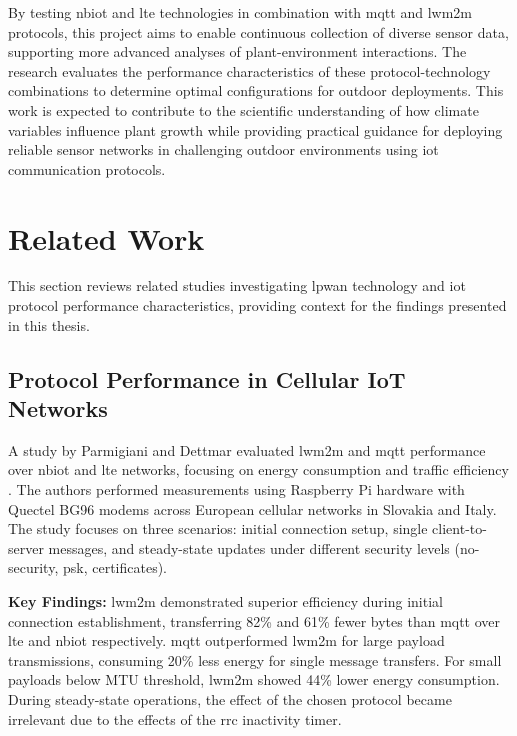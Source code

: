 \documentclass[12pt, english, openany]{book}
\begin{document}
By testing \gls{nbiot} and \gls{lte} technologies in combination with \gls{mqtt} and \gls{lwm2m} protocols, this project aims to enable continuous collection of diverse sensor data, supporting more advanced analyses of plant-environment interactions. The research evaluates the performance characteristics of these protocol-technology combinations to determine optimal configurations for outdoor deployments. This work is expected to contribute to the scientific understanding of how climate variables influence plant growth while providing practical guidance for deploying reliable sensor networks in challenging outdoor environments using \gls{iot} communication protocols.

\section{Related Work} \label{sec:related_work}

This section reviews related studies investigating \gls{lpwan} technology and \gls{iot} protocol performance characteristics, providing context for the findings presented in this thesis.

\subsection{Protocol Performance in Cellular IoT Networks}

A study by Parmigiani and Dettmar evaluated \gls{lwm2m} and \gls{mqtt} performance over \gls{nbiot} and \gls{lte} networks, focusing on energy consumption and traffic efficiency \parencite{related_work_comparison}. The authors performed measurements using Raspberry Pi hardware with Quectel BG96 modems across European cellular networks in Slovakia and Italy. The study focuses on three scenarios: initial connection setup, single client-to-server messages, and steady-state updates under different security levels (no-security, \gls{psk}, certificates).

\textbf{Key Findings:} \gls{lwm2m} demonstrated superior efficiency during initial connection establishment, transferring 82\% and 61\% fewer bytes than \gls{mqtt} over \gls{lte} and \gls{nbiot} respectively. \gls{mqtt} outperformed \gls{lwm2m} for large payload transmissions, consuming 20\% less energy for single message transfers. For small payloads below MTU threshold, \gls{lwm2m} showed 44\% lower energy consumption. During steady-state operations, the effect of the chosen protocol became irrelevant due to the effects of the \gls{rrc} inactivity timer.
\end{document}
